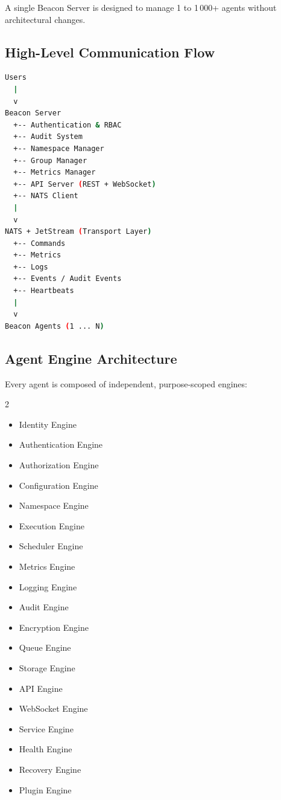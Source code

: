 \documentclass[12pt,a4paper]{article}
\begin{document}
A single Beacon Server is designed to manage 1 to 1\,000+ agents without architectural changes.

\subsection{High-Level Communication Flow}

\begin{lstlisting}[language=bash, caption={System Data Flow}]
Users
  |
  v
Beacon Server
  +-- Authentication & RBAC
  +-- Audit System
  +-- Namespace Manager
  +-- Group Manager
  +-- Metrics Manager
  +-- API Server (REST + WebSocket)
  +-- NATS Client
  |
  v
NATS + JetStream (Transport Layer)
  +-- Commands
  +-- Metrics
  +-- Logs
  +-- Events / Audit Events
  +-- Heartbeats
  |
  v
Beacon Agents (1 ... N)
\end{lstlisting}

\subsection{Agent Engine Architecture}

Every agent is composed of independent, purpose-scoped engines:

\begin{multicols}{2}
\begin{itemize}[noitemsep,leftmargin=*]
    \item Identity Engine
    \item Authentication Engine
    \item Authorization Engine
    \item Configuration Engine
    \item Namespace Engine
    \item Execution Engine
    \item Scheduler Engine
    \item Metrics Engine
    \item Logging Engine
    \item Audit Engine
    \item Encryption Engine
    \item Queue Engine
    \item Storage Engine
    \item API Engine
    \item WebSocket Engine
    \item Service Engine
    \item Health Engine
    \item Recovery Engine
    \item Plugin Engine
\end{itemize}
\end{multicols}
\end{document}
